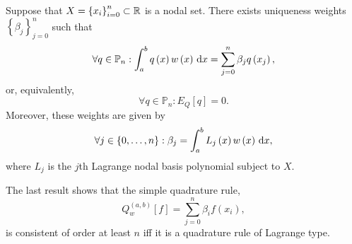 \begin{frame}
    \begin{theorem}
        Suppose that $X={\left\{x_{i}\right\}}_{i=0}^{n}\subset\mathbb{R}$ is a nodal set.
        There exists uniqueness weights $\left\{\beta_{j}\right\}_{j=0}^{n}$
        such that
        \begin{equation*}
            \forall q\in\mathbb{P}_{n}:
            \int_{a}^{b}
            q\left(x\right)
            w\left(x\right)
            \dl x=
            \sum_{j=0}^{n}
            \beta_{j}
            q\left(x_{j}\right),
        \end{equation*}
        or, equivalently,
        \begin{equation*}
            \forall q\in\mathbb{P}_{n}:
            E_{Q}\left[q\right]=0.
        \end{equation*}
        Moreover, these weights are given by
        \begin{equation*}
            \forall j\in\left\{0,\dotsc,n\right\}:
            \beta_{j}=
            \int_{a}^{b}
            L_{j}\left(x\right)
            w\left(x\right)
            \dl x,
        \end{equation*}
        where $L_{j}$ is the $j$th Lagrange nodal basis polynomial subject to $X$.
    \end{theorem}

    \begin{theorem}[consistency]
        The last result shows that the simple quadrature rule,
        \begin{equation*}
            Q^{\left(a,b\right)}_{w}
            \left[f\right]=
            \sum_{j=0}^{n}
            \beta_{i}
            f\left(x_{i}\right),
        \end{equation*}
        is consistent of order at least $n$ iff it is a quadrature
        rule of Lagrange type.
    \end{theorem}
\end{frame}

